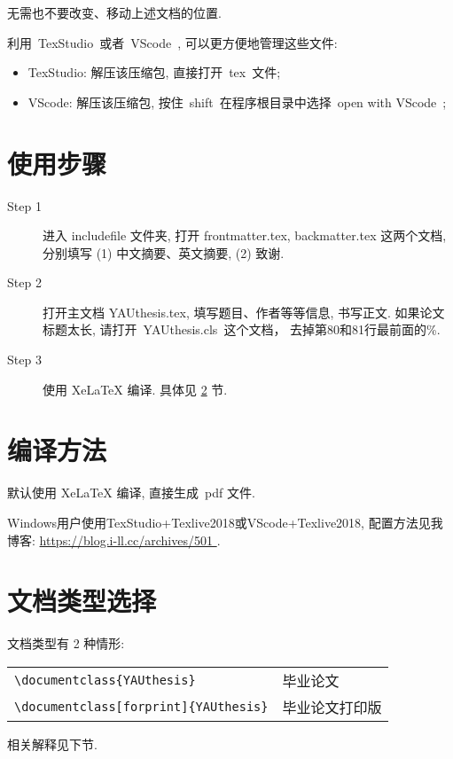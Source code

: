 \documentclass[forprint]{YAUthesis}
\begin{document}
无需也不要改变、移动上述文档的位置.


利用~TexStudio~或者~VScode~, 可以更方便地管理这些文件:
\begin{itemize}
    \item TexStudio: 解压该压缩包, 直接打开~tex~文件;
    \item VScode: 解压该压缩包, 按住~shift~在程序根目录中选择~open with VScode~;
\end{itemize} 

 \section{使用步骤}

 \begin{description}

  \item[Step 1]  进入 includefile 文件夹,  打开 frontmatter.tex, backmatter.tex 这两个文档,
        分别填写 (1) 中文摘要、英文摘要, (2) 致谢.

  \item[Step 2]  打开主文档 YAUthesis.tex, 填写题目、作者等等信息, 书写正文. 如果论文标题太长, 请打开~YAUthesis.cls~这个文档， 去掉第80和81行最前面的\%.

  \item[Step 3]  使用 XeLaTeX 编译. 具体见 \ref{sec-compile} 节.


\end{description}


\section{编译方法} \label{sec-compile}

默认使用 XeLaTeX 编译, 直接生成~pdf 文件.

Windows用户使用TexStudio+Texlive2018或VScode+Texlive2018, 配置方法见我博客: \url{https://blog.i-ll.cc/archives/501
}.   




\section{文档类型选择}
文档类型有 2 种情形:

\begin{table}[ht]\centering
\begin{tabular}{ll}
\hline
   \verb|\documentclass{YAUthesis}|                     &  毕业论文 \\
   \verb|\documentclass[forprint]{YAUthesis}|        &  毕业论文打印版 \\
\hline
\end{tabular}
\end{table}
相关解释见下节.
\end{document}
